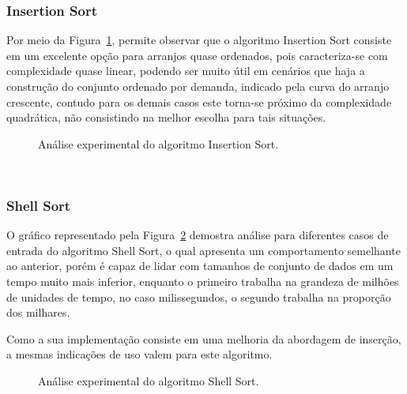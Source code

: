 \documentclass[conference]{IEEEtran}
\begin{document}
\subsubsection{Insertion Sort}

Por meio da Figura~\ref{image: graph-insertion}, permite observar que o algoritmo Insertion Sort consiste em um excelente opção para arranjos quase ordenados, pois caracteriza-se com complexidade quase linear, podendo ser muito útil em cenários que haja a construção do conjunto ordenado por demanda, indicado pela curva do arranjo crescente, contudo para os demais casos este torna-se próximo da complexidade quadrática, não consistindo na melhor escolha para tais situações.

\begin{figure}

\centering
{}
\caption{Análise experimental do algoritmo Insertion Sort.}
\label{image: graph-insertion}
\end{figure}
~\\
\subsubsection{Shell Sort}
O gráfico representado pela Figura~\ref{image: graph-shell} demostra análise para diferentes casos de entrada do algoritmo Shell Sort, o qual apresenta um comportamento semelhante ao anterior, porém é capaz de lidar com tamanhos de conjunto de dados em um tempo muito mais inferior, enquanto o primeiro trabalha na grandeza de milhões de unidades de tempo, no caso milissegundos, o segundo trabalha na proporção dos milhares. 

Como a sua implementação consiste em uma melhoria da abordagem de inserção, a mesmas indicações de uso valem para este algoritmo.


\begin{figure}

\centering
{}
\caption{Análise experimental do algoritmo Shell Sort.}
\label{image: graph-shell}
\end{figure}
~\\
\end{document}
